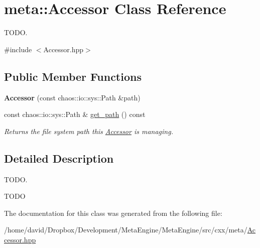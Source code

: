\hypertarget{classmeta_1_1_accessor}{\section{meta\-:\-:Accessor Class Reference}
\label{classmeta_1_1_accessor}
}


T\-O\-D\-O.  




{\ttfamily \#include $<$Accessor.\-hpp$>$}

\subsection*{Public Member Functions}
\begin{DoxyCompactItemize}
\item 
\hypertarget{classmeta_1_1_accessor_a1a083c47c245c81829b37f8a23eacb17}{{\bfseries Accessor} (const chaos\-::io\-::sys\-::\-Path \&path)}\label{classmeta_1_1_accessor_a1a083c47c245c81829b37f8a23eacb17}

\item 
\hypertarget{classmeta_1_1_accessor_ae74479589be3e6baa03b61940710db77}{const chaos\-::io\-::sys\-::\-Path \& \hyperlink{classmeta_1_1_accessor_ae74479589be3e6baa03b61940710db77}{get\-\_\-path} () const }\label{classmeta_1_1_accessor_ae74479589be3e6baa03b61940710db77}

\begin{DoxyCompactList}\small\item\em Returns the file system path this \hyperlink{classmeta_1_1_accessor}{Accessor} is managing. \end{DoxyCompactList}\end{DoxyCompactItemize}


\subsection{Detailed Description}
T\-O\-D\-O. 

T\-O\-D\-O 

The documentation for this class was generated from the following file\-:\begin{DoxyCompactItemize}
\item 
/home/david/\-Dropbox/\-Development/\-Meta\-Engine/\-Meta\-Engine/src/cxx/meta/\hyperlink{_accessor_8hpp}{Accessor.\-hpp}\end{DoxyCompactItemize}
